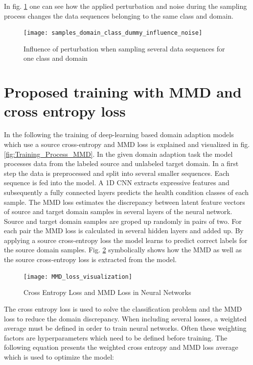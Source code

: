 In fig. \ref{fig:samples_domain_class_dummy_influence_noise} one can see how the applied perturbation and noise during the sampling process changes the data sequences belonging to the same class and domain. 


\begin{figure}[htpb]
  \centering
  \texttt{[image: samples\_domain\_class\_dummy\_influence\_noise]}
  \caption {Influence of perturbation when sampling several data sequences for one class and domain}
  \label{fig:samples_domain_class_dummy_influence_noise}
\end{figure}




\section{Proposed training with MMD and cross entropy loss} \label{sec:Proposed_training}

In the following the training of deep-learning based domain adaption models which use a source cross-entropy and MMD loss is explained and visualized in fig. \ref{fig:Training_Process_MMD}. In the given domain adaption task the model processes data from the labeled source and unlabeled target domain. In a first step the data is preprocessed and split into several smaller sequences. Each sequence is fed into the model. A 1D CNN extracts expressive features and subsequently a fully connected layers predicts the health condition classes of each sample. The MMD loss estimates the discrepancy between latent feature vectors of source and target domain samples in several layers of the neural network. Source and target domain samples are groped up randomly in pairs of two. For each pair the MMD loss is calculated in several hidden layers and added up. By applying a source cross-entropy loss the model learns to predict correct labels for the source domain samples. Fig. \ref{fig:MMD_Loss_and_CE_loss} symbolically shows how the MMD as well as the source cross-entropy loss is extracted from the model.

\begin{figure}[htpb]
  \centering
  \texttt{[image: MMD\_loss\_visualization]}
  \caption {Cross Entropy Loss and MMD Loss in Neural Networks} \label{fig:MMD_Loss_and_CE_loss}
\end{figure}
The cross entropy loss is used to solve the classification problem and the MMD loss to reduce the domain discrepancy. When including several losses, a weighted average must be defined in order to train neural networks. Often these weighting factors are hyperparameters which need to be defined before training. The following equation presents the weighted cross entropy and MMD loss average which is used to optimize the model:


